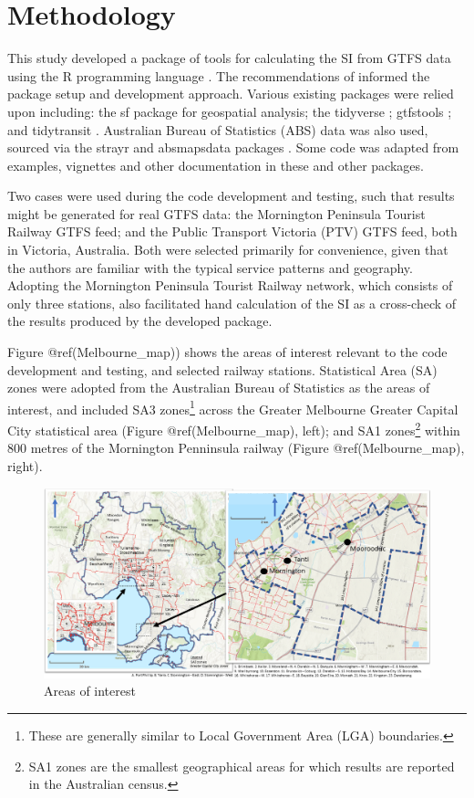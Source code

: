 \documentclass[preprint, 3p,
authoryear]{elsarticle} %
\begin{document}
\hypertarget{methodology}{%
\section{Methodology}\label{methodology}}

This study developed a package of tools for calculating the SI from GTFS
data using the R programming language \citep{R-base}. The
recommendations of \citet{wickham2023r} informed the package setup and
development approach. Various existing packages were relied upon
including: the sf package \citep{R-sf} for geospatial analysis; the
tidyverse \citep{tidyverse2019}; gtfstools \citep{R-gtfstools}; and
tidytransit \citep{R-tidytransit}. Australian Bureau of Statistics (ABS)
data was also used, sourced via the strayr and absmapsdata packages
\citep{r-strayr}. Some code was adapted from examples, vignettes and
other documentation in these and other packages.

Two cases were used during the code development and testing, such that
results might be generated for real GTFS data: the Mornington Peninsula
Tourist Railway GTFS feed; and the Public Transport Victoria (PTV) GTFS
feed, both in Victoria, Australia. Both were selected primarily for
convenience, given that the authors are familiar with the typical
service patterns and geography. Adopting the Mornington Peninsula
Tourist Railway network, which consists of only three stations, also
facilitated hand calculation of the SI as a cross-check of the results
produced by the developed package.

Figure @ref(Melbourne\_map)) shows the areas of interest relevant to the
code development and testing, and selected railway stations. Statistical
Area (SA) zones were adopted from the Australian Bureau of Statistics
\citep{ABSmaps} as the areas of interest, and included SA3
zones\footnote{These are generally similar to Local Government Area
  (LGA) boundaries.} across the Greater Melbourne Greater Capital City
statistical area (Figure @ref(Melbourne\_map), left); and SA1
zones\footnote{SA1 zones are the smallest geographical areas for which
  results are reported in the Australian census.} within 800 metres of
the Mornington Penninsula railway (Figure @ref(Melbourne\_map), right).

\begin{figure}
\includegraphics[width=1\linewidth]{graphics/all_maps} \caption{Areas of interest}\label{fig:Melbourne_map}
\end{figure}
\end{document}
